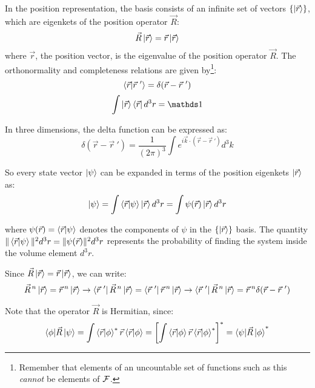 In the position representation, the basis consists of an infinite set of vectors $\{\ket{\vec{r}}\}$, which are eigenkets of the position operator $\vec{R}$:
\begin{equation}
    \vec{R}\ket{\vec{r}} = \vec{r}\ket{\vec{r}}
\end{equation}
where $\vec{r}$, the position vector, is the eigenvalue of the position operator $\vec{R}$. The orthonormality and completeness relations are given by\footnote{Remember that elements of an uncountable set of functions such as this \textit{cannot} be elements of $\mathcal{F}$.}:
\begin{equation}
    \braket{\vec{r}|\vec{r}\ '} = \delta(\vec{r} - \vec{r}\ ')
\end{equation} 
\begin{equation}
    \int \ket{\vec{r}}\bra{\vec{r}} d^3r = \Imat
\end{equation}

In three dimensions, the delta function can be expressed as:
\begin{equation}
    \delta (\vec{r} - \vec{r}\ ') = \frac{1}{(2\pi)^3}\int e^{i\vec{k}\cdot (\vec{r}-\vec{r}\ ')} d^3k
\end{equation}

So every state vector $\ket{\psi}$ can be expanded in terms of the position eigenkets $\ket{\vec{r}}$ as:
\begin{equation}
    \ket{\psi} = \int \braket{\vec{r}|\psi} \ket{\vec{r}} d^3 r = \int \psi(\vec{r}) \ket{\vec{r}} d^3 r
\end{equation}

where $\psi(\vec{r}) = \braket{\vec{r}|\psi}$ denotes the components of $\psi$ in the $\{\ket{\vec{r}}\}$ basis. The quantity $\|\braket{\vec{r}|\psi}\|^2d^3 r = \|\psi(\vec{r})\|^2d^3r$ represents the probability of finding the system inside the volume element $d^3r$.

Since $\vec{R}\ket{\vec{r}} = \vec{r}\ket{\vec{r}}$, we can write:
\begin{equation}
    \vec{R}^{\, n}\ket{\vec{r}} = \vec{r}\, ^n\ket{\vec{r}} \to \bra{\vec{r}\ '}\vec{R}^{\, n}\ket{\vec{r}} = \bra{\vec{r}\ '}\vec{r}\, ^n\ket{\vec{r}} \to \bra{\vec{r}\ '}\vec{R}^{\, n}\ket{\vec{r}} = \vec{r}\, ^n\delta(\vec{r} - \vec{r}\ ')
\end{equation}

Note that the operator $\vec{R}$ is Hermitian, since:
\begin{equation}
    \braket{\phi|\vec{R}\,|\psi} = \int \braket{\vec{r}|\phi}^*\vec{r}\braket{\vec{r}|\phi} = \left[\int \braket{\vec{r}|\phi}\vec{r}\braket{\vec{r}|\phi}^*\right]^* = \braket{\psi|\vec{R}\,|\phi}^*
\end{equation}





